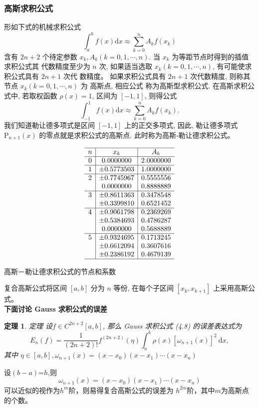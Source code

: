 \documentclass{ctexart}%
\newtheorem{theorem}{定理}%
\begin{document}
\subsubsection{高斯求积公式}
形如下式的机械求积公式
$$
\int_{a}^{b} f(x) \mathrm{d} x \approx \sum_{k=0}^{n} A_{k} f\left(x_{k}\right)
$$
含有 $2 n+2$ 个待定参数 $x_{k}, A_{k}(k=0,1, \cdots, n)$. 当 $x_{k}$ 为等距节点时得到的插值求积公式其 代数精度至少为 $n$ 次, 如果适当选取 $x_{k}(k=0,1, \cdots, n)$, 有可能使求积公式具有 $2 n+1$ 次代 数精度。
如果求积公式具有 $2 n+1$ 次代数精度, 则称其节点 $x_{k}(k=0,1, \cdots, n)$ 为 高斯点, 相应公式 称为高斯型求积公式.
在高斯求积公式中, 若取权函数 $\rho(x)=1$, 区间为 $[-1,1]$, 则得公式
$$
\int_{-1}^{1} f(x) \mathrm{d} x \approx \sum_{k=0}^{n} A_{k} f\left(x_{k}\right) .
$$
我们知道勒让德多项式是区间 $[-1,1]$ 上的正交多项式, 因此, 勒让德多项式 $\mathrm{P}_{n+1}(x)$ 的零点就是求积公式的高斯点. 此时称为高斯-勒让德求积公式。
\begin{table}[H]
$$
\begin{array}{c|c|c}
\hline n & x_{k}  & A_{k} \\
\hline 0 & 0.0000000 & 2.0000000 \\
\hline 1 & \pm 0.5773503 & 1.0000000 \\
\hline 2 & \pm 0.7745967 & 0.5555556 \\
&0.0000000 & 0.8888889 \\
\hline 3 & \pm 0.8611363 & 0.3478548 \\
&\pm 0.3399810 & 0.6521452 \\
\hline 4 & \pm 0.9061798 & 0.2369269 \\
& \pm 0.5384693 & 0.4786287 \\
& 0.0000000 & 0.5688889 \\
\hline 5 & \pm 0.9324695 & 0.1713245 \\
&\pm 0.6612094 & 0.3607616 \\
&\pm 0.2386192 & 0.4679139 \\
\hline
\end{array}
$$
\caption{高斯－勒让德求积公式的节点和系数}
\end{table}

复合高斯公式将区间 $[a, b]$ 分为 $n$ 等份, 在每个子区间 $\left[x_{k}, x_{k+1}\right]$ 上采用高斯公式。\\
\textbf{下面讨论 Gauss 求积公式的误差}
\begin{theorem}
定理 设$f \in C^{2 n+2}[a, b]$, 那么 Gauss 求积公式 (4.8) 的误差表达式为
$$
E_{n}(f)=\frac{1}{(2 n+2) !} f^{(2 n+2)}(\eta) \int_{a}^{b} \rho(x)\left[\omega_{n+1}(x)\right]^{2} \mathrm{~d} x,
$$
其中 $\eta \in[a, b], \omega_{n+1}(x)=\left(x-x_{0}\right)\left(x-x_{1}\right) \cdots\left(x-x_{n}\right)$

\label{theorem2}
\end{theorem} 
设$\left(b-a\right)$=${h}$,则$$
\omega_{n+1}(x)=\left(x-x_{0}\right)\left(x-x_{1}\right) \cdots\left(x-x_{n}\right)
$$可以近似的视作为$h^{m}$阶，则易得复合高斯公式的误差为 $h^{2m}$阶，其中${m}$为高斯点的个数。
\end{document}
